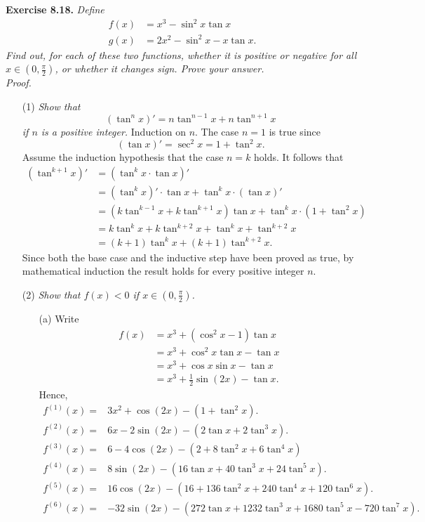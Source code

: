 \documentclass{article}
\begin{document}
\textbf{Exercise 8.18.}
\emph{Define
\begin{align*}
  f(x) &= x^3 - \sin^2 x \tan x \\
  g(x) &= 2x^2 - \sin^2 x - x \tan x.
\end{align*}
Find out, for each of these two functions, whether it is positive or negative
for all $x \in (0, \frac{\pi}{2})$,
or whether it changes sign.
Prove your answer.} \\

\emph{Proof.}
\begin{enumerate}
\item[(1)]
\emph{Show that
\[
  (\tan^n x)' = n \tan^{n-1} x + n \tan^{n+1} x
\]
if $n$ is a positive integer.}
Induction on $n$.
The case $n=1$ is true since
\[
  (\tan x)' = \sec^2 x = 1 + \tan^2 x.
\]
Assume the induction hypothesis that the case $n=k$ holds.
It follows that
\begin{align*}
  (\tan^{k+1} x)'
  &= (\tan^{k} x \cdot \tan x)' \\
  &= (\tan^{k} x)' \cdot \tan x + \tan^{k} x \cdot (\tan x)' \\
  &= (k \tan^{k-1} x + k \tan^{k+1} x) \tan x
    + \tan^{k} x \cdot (1 + \tan^2 x) \\
  &= k \tan^{k} x + k \tan^{k+2} x + \tan^{k} x + \tan^{k+2} x \\
  &= (k+1)\tan^{k} x + (k+1)\tan^{k+2} x.
\end{align*}
Since both the base case and the inductive step have been proved as true,
by mathematical induction the result holds for every positive integer $n$.

\item[(2)]
\emph{Show that $f(x) < 0$ if $x \in (0, \frac{\pi}{2})$.}
  \begin{enumerate}
    \item[(a)]
      Write
      \begin{align*}
        f(x)
        &= x^3 + (\cos^2 x-1) \tan x \\
        &= x^3 + \cos^2 x \tan x - \tan x\\
        &= x^3 + \cos x \sin x - \tan x \\
        &= x^3 + \frac{1}{2} \sin(2x) - \tan x.
      \end{align*}
      Hence,
      \begin{align*}
        f^{(1)}(x) =& 3x^2 + \cos(2x) - (1 + \tan^2 x). \\
        f^{(2)}(x) =& 6x - 2\sin(2x) - (2 \tan x + 2\tan^3 x). \\
        f^{(3)}(x) =& 6 - 4\cos(2x) - (2 + 8 \tan^2 x + 6\tan^4 x) \\
        f^{(4)}(x) =& 8\sin(2x) - (16\tan x + 40 \tan^3 x + 24 \tan^5 x). \\
        f^{(5)}(x) =& 16\cos(2x) - (16 + 136\tan^2 x + 240 \tan^4 x + 120 \tan^6 x). \\
        f^{(6)}(x) =& -32\sin(2x) - (272\tan x + 1232\tan^3 x + 1680\tan^5 x - 720\tan^7 x).
      \end{align*}


\end{enumerate}
\end{enumerate}
\end{document}
